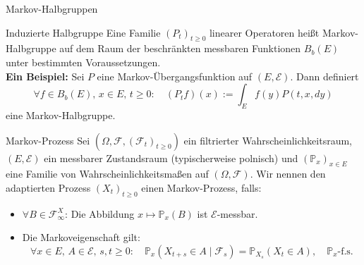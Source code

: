 \documentclass[11pt,aspectratio=169]{beamer}
\begin{document}
\begin{frame}{Markov-Halbgruppen}\small

\begin{block}{Induzierte Halbgruppe}
  Eine Familie $(P_t)_{t \geq 0}$ linearer Operatoren heißt Markov-Halbgruppe auf dem Raum der beschränkten messbaren Funktionen $B_b(E)$ unter bestimmten Voraussetzungen. \\
  \textbf{Ein Beispiel:} Sei $P$ eine Markov-Übergangsfunktion auf $(E,\mathcal{E})$. Dann definiert
  \[
  \forall f \in B_b(E), \, x \in E, \, t \geq 0: \quad (P_t f)(x) := \int_E f(y) P(t,x,dy)
  \]
  eine Markov-Halbgruppe.
\end{block}
\end{frame}


\begin{frame}{Markov-Prozess}
Sei $(\Omega,\mathcal{F}, (\mathcal{F}_t)_{t \geq 0})$ ein filtrierter Wahrscheinlichkeitsraum, $(E,\mathcal{E})$ ein messbarer Zustandsraum (typischerweise polnisch) und $(\mathbb{P}_x)_{x \in E}$ eine Familie von Wahrscheinlichkeitsmaßen auf $(\Omega,\mathcal{F})$. Wir nennen den adaptierten Prozess $(X_t)_{t \geq 0}$ einen Markov-Prozess, falls:
\begin{itemize}
  \item $\forall B \in \mathcal{F}_\infty^X$: Die Abbildung $x \mapsto \mathbb{P}_x(B)$ ist $\mathcal{E}$-messbar.
  \item Die Markoveigenschaft gilt:
  \[
  \forall x \in E, \, A \in \mathcal{E}, \, s,t \geq 0: \quad \mathbb{P}_x( X_{t+s} \in A \mid \mathcal{F}_s ) = \mathbb{P}_{X_s}(X_t \in A), \quad \mathbb{P}_x\text{-f.s.}
  \]
\end{itemize}
\end{frame}
\end{document}
